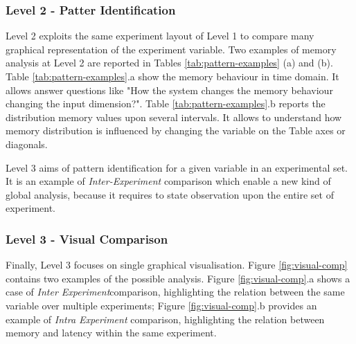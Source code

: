 \subsubsection{Level 2 - Patter Identification}\label{sec:impl-level2}

%  	



\noindent Level 2 exploits the same experiment layout of Level 1 to compare many graphical representation of the experiment variable. Two examples of memory analysis at Level 2 are reported in Tables \ref{tab:pattern-examples} (a) and (b). Table \ref{tab:pattern-examples}.a show the memory behaviour in time domain. It allows answer questions like "How the system changes the memory behaviour changing the input dimension?". Table \ref{tab:pattern-examples}.b reports the distribution memory values upon several intervals. It allows to understand how memory distribution is influenced by changing the variable on the Table axes or diagonals.

Level 3 aims of pattern identification for a given variable in an experimental set. It is an example of \textit{Inter-Experiment} comparison which enable a new kind of global analysis, because it requires to state observation upon the entire set of experiment.

\subsubsection{Level 3 - Visual Comparison}\label{sec:impl-level3}

\noindent Finally, Level 3 focuses on single graphical visualisation. Figure \ref{fig:visual-comp} contains two examples of the possible analysis. Figure \ref{fig:visual-comp}.a shows a case of \textit{Inter Experiment}comparison, highlighting the relation between the same variable over multiple experiments; Figure \ref{fig:visual-comp}.b provides an example of \textit{Intra Experiment} comparison, highlighting the relation between memory and latency within the same experiment.

